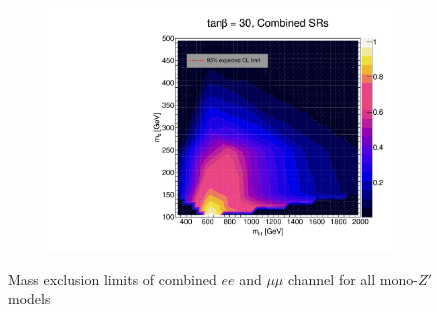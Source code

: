\documentclass[12pt, a4paper]{book}
\begin{document}
\begin{figure}[!ht]
\begin{subfigure}[b]{0.49\textwidth}
   \end{subfigure}
   \hfill
   \begin{subfigure}[b]{0.49\textwidth}
      \centering
      \includegraphics[width=1\textwidth]{Limits/Model_independent/2HDM/2HDM_ll_tb30.pdf}
   \end{subfigure}
   \caption[Mass exclusion limits of combined $ee$ and $\mu\mu$ channel for all mono-$Z'$]{Mass exclusion limits of combined $ee$ and $\mu\mu$ channel for all mono-$Z'$ models}
\end{figure}


\clearpage
\end{document}
